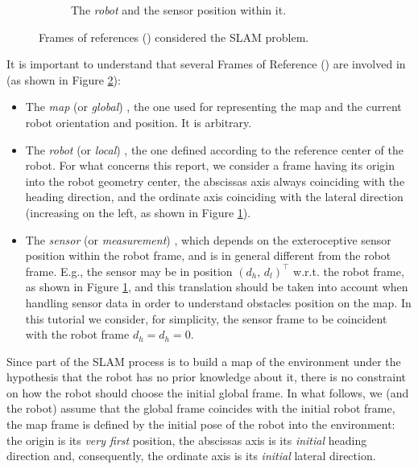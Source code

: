 \begin{figure}
\begin{subfigure}[b]{.38\textwidth}
		\caption{The \emph{robot} \FoR{} and the sensor position within it.}
		\label{fig.fors.robot}
	\end{subfigure}
	\caption{Frames of references (\FoR) considered the SLAM problem.}
	\label{fig.fors}
\end{figure}

It is important to understand that several Frames of Reference (\FoR{}) are involved in \SLAM{} (as shown in Figure \ref{fig.fors}):
\begin{itemize}
	\item The \emph{map} (or \emph{global}) \FoR{}, \ie{} the one used for representing the map and the current robot orientation and position. 
	It is arbitrary.
	
	\item The \emph{robot} (or \emph{local}) \FoR{}, \ie{} the one defined according to the reference center of the robot. 
	For what concerns this report, we consider a frame having its origin into the robot geometry center, the abscissas axis always coinciding with the heading direction, and the ordinate axis coinciding with the lateral direction (increasing on the left, as shown in Figure \ref{fig.fors.robot}).
	
	\item The \emph{sensor} (or \emph{measurement}) \FoR{}, which depends on the exteroceptive sensor position within the robot frame, and is in general different from the robot frame. 
	E.g., the sensor may be in position $(d_h,\, d_l)^\top$ w.r.t. the robot frame, as shown in Figure \ref{fig.fors.robot}, and this translation should be taken into account when handling sensor data in order to understand obstacles position on the map.
	In this tutorial we consider, for simplicity, the sensor frame to be coincident with the robot frame \ie{} $d_h = d_h = 0$.
	
\end{itemize}

Since part of the SLAM process is to build a map of the environment under the hypothesis that the robot has no prior knowledge about it, there is no constraint on how the robot should choose the initial global frame.
In what follows, we (and the robot) assume that the global frame coincides with the initial robot frame, \ie{} the map frame is defined by the initial pose of the robot into the environment: the origin is its \emph{very first} position, the abscissas axis is its \emph{initial} heading direction and, consequently, the ordinate axis is its \emph{initial} lateral direction.

